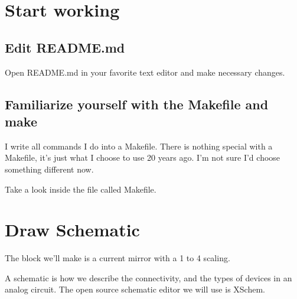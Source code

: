 \begin{Shaded}
\begin{Highlighting}[]
\DataTypeTok{\textbackslash{}}
\OperatorTok{\textless{}}\OperatorTok{\textgreater{}}
\end{Highlighting}
\end{Shaded}

\section{Start working}\label{start-working}

\subsection{Edit README.md}\label{edit-readme.md}

Open README.md in your favorite text editor and make necessary changes.

\subsection{Familiarize yourself with the Makefile and
make}\label{familiarize-yourself-with-the-makefile-and-make}

I write all commands I do into a Makefile. There is nothing special with
a Makefile, it's just what I choose to use 20 years ago. I'm not sure
I'd choose something different now.

\begin{Shaded}
\begin{Highlighting}[]
\end{Highlighting}
\end{Shaded}

Take a look inside the file called Makefile.

\section{\texorpdfstring{Draw Schematic
}{Draw Schematic }}\label{draw-schematic}

The block we'll make is a current mirror with a 1 to 4 scaling.

A schematic is how we describe the connectivity, and the types of
devices in an analog circuit. The open source schematic editor we will
use is XSchem.

